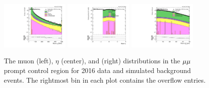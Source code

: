 \begin{figure}
\centering
\includegraphics[width=0.3\textwidth]{figures/selection/pcr_mumu_2016/muonPt.pdf}
\includegraphics[width=0.3\textwidth]{figures/selection/pcr_mumu_2016/muonEta.pdf}
\includegraphics[width=0.3\textwidth]{figures/selection/pcr_mumu_2016/muonAbsD0_50um.pdf}
\caption{The muon \pt (left), $\eta$ (center), and \ad (right) distributions in the ${\mu}{\mu}$ prompt control region for 2016 data and simulated background events. The rightmost bin in each plot contains the overflow entries.}
\label{pcr_mumu_2016}
\end{figure}